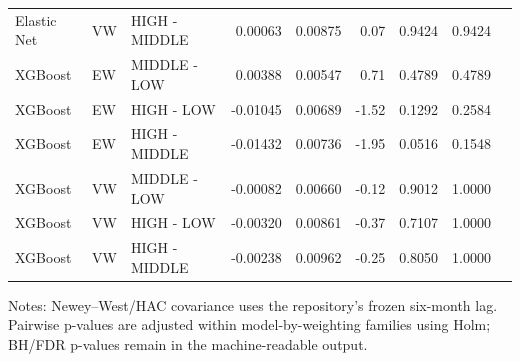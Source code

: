 \begin{table}[htbp]
\begin{tabular}{lllrrrrrr}
Elastic Net & VW & HIGH - MIDDLE & 0.00063 & 0.00875 & 0.07 & 0.9424 & 0.9424 &  \\
XGBoost & EW & MIDDLE - LOW & 0.00388 & 0.00547 & 0.71 & 0.4789 & 0.4789 &  \\
XGBoost & EW & HIGH - LOW & -0.01045 & 0.00689 & -1.52 & 0.1292 & 0.2584 &  \\
XGBoost & EW & HIGH - MIDDLE & -0.01432 & 0.00736 & -1.95 & 0.0516 & 0.1548 &  \\
XGBoost & VW & MIDDLE - LOW & -0.00082 & 0.00660 & -0.12 & 0.9012 & 1.0000 &  \\
XGBoost & VW & HIGH - LOW & -0.00320 & 0.00861 & -0.37 & 0.7107 & 1.0000 &  \\
XGBoost & VW & HIGH - MIDDLE & -0.00238 & 0.00962 & -0.25 & 0.8050 & 1.0000 &  \\
\hline
\end{tabular}
\begin{flushleft}\footnotesize Notes: Newey--West/HAC covariance uses the repository's frozen six-month lag. Pairwise p-values are adjusted within model-by-weighting families using Holm; BH/FDR p-values remain in the machine-readable output.\end{flushleft}
\end{table}
